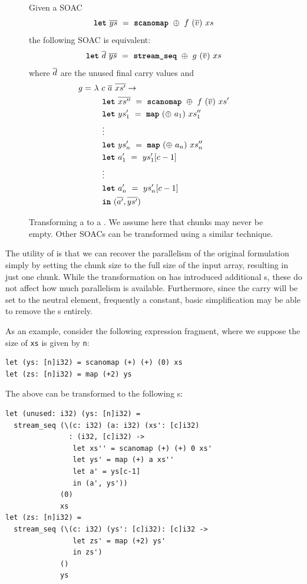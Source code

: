 \begin{figure}
Given a SOAC
\[
  \mbox{\texttt{\bfseries{let}}}~\overline{ys}~=~\mbox{\texttt{\bfseries{scanomap}}}~\oplus~f~(\overline{v})~xs
\]
the following SOAC is equivalent:
\[
  \mbox{\texttt{\bfseries{let}}}~\overline{d}~\overline{ys}~=~\mbox{\texttt{\bfseries{stream\_seq}}}{}~\oplus~g~(\overline{v})~xs
\]
where $\overline{d}$ are the unused final carry values and
  \begin{align*}
    g =~& \lambda~c~\overline{a}~\overline{xs'} \rightarrow \\
        & \quad \mbox{\texttt{\bfseries{let}}}~\overline{xs''}~=~\mbox{\texttt{\bfseries{scanomap}}}~\oplus~f~(\overline{v})~xs' \\
        & \quad \mbox{\texttt{\bfseries{let}}}~ys'_{1}~=~\mbox{\texttt{\bfseries{map}}}~(\oplus~a_{1})~xs''_{1} \\
        & \quad \vdots \\
        & \quad \mbox{\texttt{\bfseries{let}}}~ys'_{n}~=~\mbox{\texttt{\bfseries{map}}}~(\oplus~a_{n})~xs''_{n} \\
        & \quad \mbox{\texttt{\bfseries{let}}}~a'_{1}~=~ys'_{1}[c-1] \\
        & \quad \vdots \\
        & \quad \mbox{\texttt{\bfseries{let}}}~a'_{n}~=~ys'_{n}[c-1] \\
        & \quad \mbox{\texttt{\bfseries{in}}}~(\overline{a'},\overline{ys'})
  \end{align*}
  \caption{Transforming a  to a \StreamSeq{}.  We assume
    here that chunks may never be empty.  Other SOACs can be
    transformed using a similar technique.}
  \label{fig:scanomap-to-streamseq}
\end{figure}

The utility of \StreamSeq{} is that we can recover the parallelism of
the original formulation simply by setting the chunk size to the full
size of the input array, resulting in just one chunk.  While the
transformation on  has introduced
additional s, these do not affect how much parallelism is
available.  Furthermore, since the carry will be set to the neutral
element, frequently a constant, basic simplification may be able to
remove the s entirely.

As an example, consider the following expression fragment, where we
suppose the size of \lstinline{xs} is given by \lstinline{n}:

\begin{lstlisting}
let (ys: [n]i32) = scanomap (+) (+) (0) xs
let (zs: [n]i32) = map (+2) ys
\end{lstlisting}

The above can be transformed to the following \StreamSeq{}s:

\begin{lstlisting}
let (unused: i32) (ys: [n]i32) =
  stream_seq (\(c: i32) (a: i32) (xs': [c]i32)
               : (i32, [c]i32) ->
                let xs'' = scanomap (+) (+) 0 xs'
                let ys' = map (+) a xs''
                let a' = ys[c-1]
                in (a', ys'))
             (0)
             xs
let (zs: [n]i32) =
  stream_seq (\(c: i32) (ys': [c]i32): [c]i32 ->
                let zs' = map (+2) ys'
                in zs')
             ()
             ys
\end{lstlisting}

